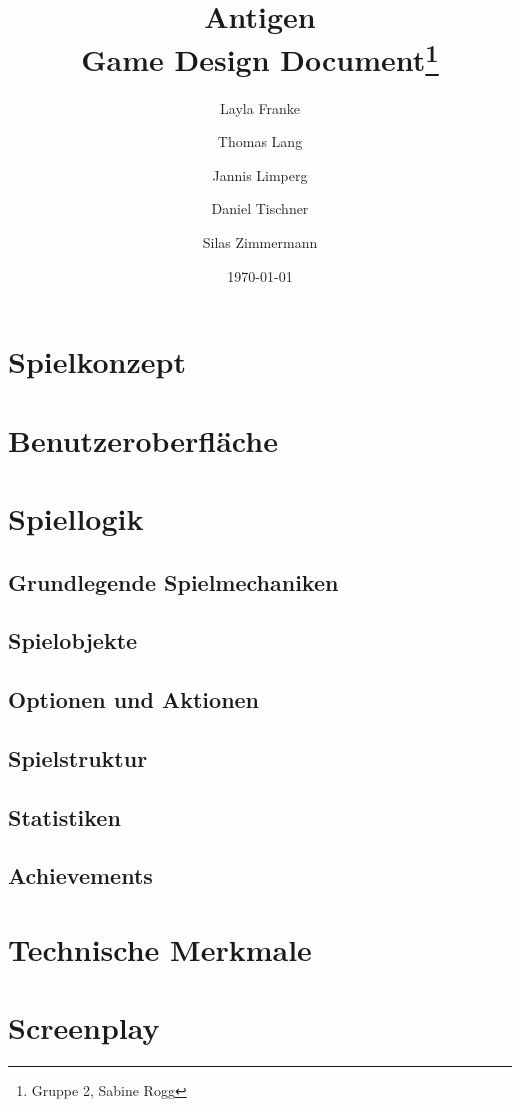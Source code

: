 \documentclass{scrartcl}
\newcommand*{\name}{Antigen}
\begin{document}
\title{\name\\Game Design Document\thanks{Gruppe 2, Sabine Rogg}}
\author{Layla Franke \and Thomas Lang \and Jannis Limperg \and Daniel Tischner
        \and Silas Zimmermann}
\date{\today}
\maketitle
\newpage

\section{Spielkonzept}
\label{sec:spielkonzept}


\section{Benutzeroberfläche}
\label{sec:benutzeroberflaeche}


\section{Spiellogik}
\label{sec:spiellogik}

\subsection{Grundlegende Spielmechaniken}
\label{sec:spielmechaniken}


\subsection{Spielobjekte}
\label{sec:spielobjekte}


\subsection{Optionen und Aktionen}
\label{sec:optionen_aktionen}


\subsection{Spielstruktur}
\label{sec:spielstruktur}


\subsection{Statistiken}
\label{sec:statistiken}


\subsection{Achievements}
\label{sec:achievements}


\section{Technische Merkmale}
\label{sec:technische_merkmale}


\section{Screenplay}
\label{sec:screenplay}

\end{document}

